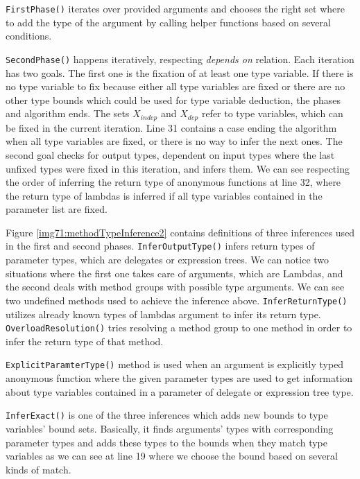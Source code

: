 \par
{}
\texttt{FirstPhase()} iterates over provided arguments and chooses the right set where to add the type of the argument by calling helper functions based on several conditions.
\par
{}
\texttt{SecondPhase()} happens iteratively, respecting \textit{depends on} relation.
Each iteration has two goals.
The first one is the fixation of at least one type variable.
If there is no type variable to fix because either all type variables are fixed or there are no other type bounds which could be used for type variable deduction, the phases and algorithm ends.
The sets \texttt{$X_{indep}$} and \texttt{$X_{dep}$} refer to type variables, which can be fixed in the current iteration.
Line 31 contains a case ending the algorithm when all type variables are fixed, or there is no way to infer the next ones.
The second goal checks for output types, dependent on input types where the last unfixed types were fixed in this iteration, and infers them.
We can see respecting the order of inferring the return type of anonymous functions at line 32, where the return type of lambdas is inferred if all type variables contained in the parameter list are fixed.
\par
{}
Figure \ref{img71:methodTypeInference2} contains definitions of three inferences used in the first and second phases.
\texttt{InferOutputType()} infers return types of parameter types, which are delegates or expression trees.
We can notice two situations where the first one takes care of arguments, which are Lambdas, and the second deals with method groups with possible type arguments. 
We can see two undefined methods used to achieve the inference above.
\texttt{InferReturnType()} utilizes already known types of lambdas argument to infer its return type.
\texttt{OverloadResolution()} tries resolving a method group to one method in order to infer the return type of that method.
\par
{}
\texttt{ExplicitParamterType()} method is used when an argument is explicitly typed anonymous function where the given parameter types are used to get information about type variables contained in a parameter of delegate or expression tree type.
\par
{}
\texttt{InferExact()} is one of the three inferences which adds new bounds to type variables' bound sets.
Basically, it finds arguments' types with corresponding parameter types and adds these types to the bounds when they match type variables as we can see at line 19 where we choose the bound based on several kinds of match.
